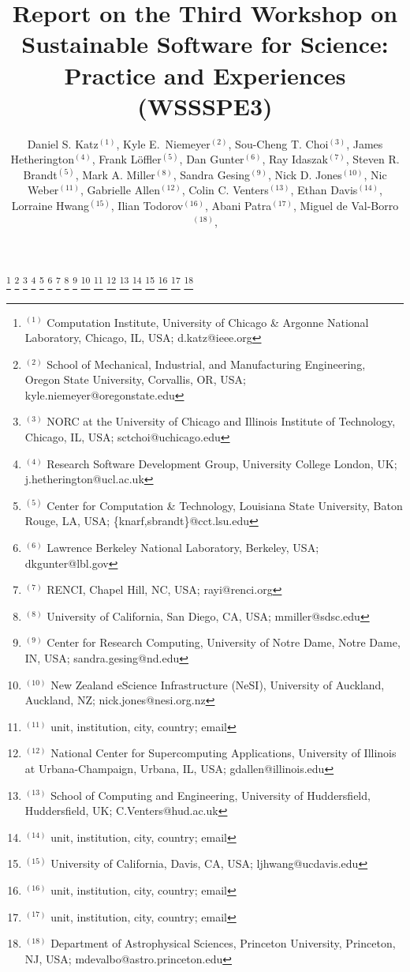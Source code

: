 \documentclass[11pt, oneside]{amsart}
\begin{document}
\title[]{Report on the Third Workshop on Sustainable Software for Science: Practice and Experiences (WSSSPE3)}

\author{Daniel S. Katz$^{(1)}$,
Kyle E.\ Niemeyer$^{(2)}$,
Sou-Cheng T. Choi$^{(3)}$,
James Hetherington$^{(4)}$,
Frank L\"{o}ffler$^{(5)}$,
Dan Gunter$^{(6)}$,
Ray Idaszak$^{(7)}$,
Steven R. Brandt$^{(5)}$,
Mark A. Miller$^{(8)}$,
Sandra Gesing$^{(9)}$,
Nick D. Jones$^{(10)}$,
Nic Weber$^{(11)}$,
Gabrielle Allen$^{(12)}$,
Colin C. Venters$^{(13)}$,
Ethan Davis$^{(14)}$,
Lorraine Hwang$^{(15)}$,
Ilian Todorov$^{(16)}$,
Abani Patra$^{(17)}$,
Miguel de Val-Borro$^{(18)}$,
}


%
\thanks{{}$^{(1)}$ Computation Institute, 
University of Chicago \& Argonne National Laboratory, Chicago, IL, USA; d.katz@ieee.org}
%
\thanks{{}$^{(2)}$ School of Mechanical, Industrial, and Manufacturing Engineering, 
Oregon State University, Corvallis, OR, USA; kyle.niemeyer@oregonstate.edu}
%
\thanks{{}$^{(3)}$ NORC at the University of Chicago and Illinois Institute of Technology, Chicago, IL, USA; sctchoi@uchicago.edu}
%
\thanks{{}$^{(4)}$ Research Software Development Group, University College London, UK; j.hetherington@ucl.ac.uk}
%
\thanks{{}$^{(5)}$ Center for Computation \& Technology, Louisiana State University, Baton Rouge, LA, USA; \{knarf,sbrandt\}@cct.lsu.edu}
%
\thanks{{}$^{(6)}$ Lawrence Berkeley National Laboratory, Berkeley, USA; dkgunter@lbl.gov}
%
\thanks{{}$^{(7)}$ RENCI, Chapel Hill, NC, USA; rayi@renci.org}
%
\thanks{{}$^{(8)}$ University of California, San Diego, CA, USA; mmiller@sdsc.edu}
%
\thanks{{}$^{(9)}$ Center for Research Computing, University of Notre Dame, Notre Dame, IN, USA; sandra.gesing@nd.edu}
%
\thanks{{}$^{(10)}$ New Zealand eScience Infrastructure (NeSI), University of Auckland, Auckland, NZ; nick.jones@nesi.org.nz}
%
\thanks{{}$^{(11)}$ unit, institution, city, country; email}
%
\thanks{{}$^{(12)}$ National Center for Supercomputing Applications, University of Illinois at Urbana-Champaign, Urbana, IL, USA; gdallen@illinois.edu}
%
\thanks{{}$^{(13)}$ School of Computing and Engineering, University of Huddersfield, Huddersfield, UK; C.Venters@hud.ac.uk}
%
\thanks{{}$^{(14)}$ unit, institution, city, country; email}
%
\thanks{{}$^{(15)}$  University of California, Davis, CA, USA; ljhwang@ucdavis.edu}
%
\thanks{{}$^{(16)}$ unit, institution, city, country; email}
%
\thanks{{}$^{(17)}$ unit, institution, city, country; email}
%
\thanks{{}$^{(18)}$ Department of Astrophysical Sciences, 
Princeton University, Princeton, NJ, USA; mdevalbo@astro.princeton.edu}
%
 
\end{document}
